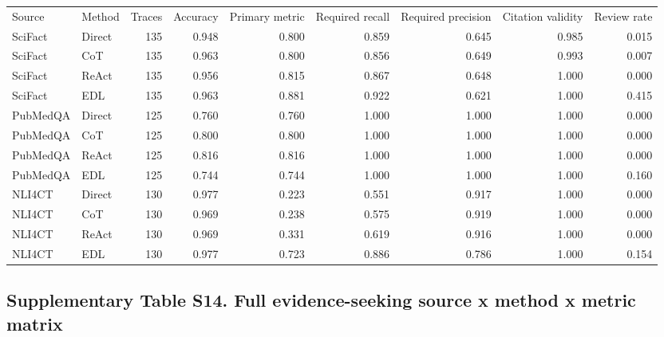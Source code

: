 \documentclass[
  8pt,
]{extarticle}
\begin{document}
\begin{center}
\begin{adjustbox}{max width=0.95\textwidth}
\begin{tabular}{@{}
llrrrrrrr@{}}
\toprule\noalign{}
Source & Method & Traces & Accuracy & Primary metric & Required recall &
Required precision & Citation validity & Review rate \\

SciFact & Direct & 135 & 0.948 & 0.800 & 0.859 & 0.645 & 0.985 &
0.015 \\
SciFact & CoT & 135 & 0.963 & 0.800 & 0.856 & 0.649 & 0.993 & 0.007 \\
SciFact & ReAct & 135 & 0.956 & 0.815 & 0.867 & 0.648 & 1.000 & 0.000 \\
SciFact & EDL & 135 & 0.963 & 0.881 & 0.922 & 0.621 & 1.000 & 0.415 \\
PubMedQA & Direct & 125 & 0.760 & 0.760 & 1.000 & 1.000 & 1.000 &
0.000 \\
PubMedQA & CoT & 125 & 0.800 & 0.800 & 1.000 & 1.000 & 1.000 & 0.000 \\
PubMedQA & ReAct & 125 & 0.816 & 0.816 & 1.000 & 1.000 & 1.000 &
0.000 \\
PubMedQA & EDL & 125 & 0.744 & 0.744 & 1.000 & 1.000 & 1.000 & 0.160 \\
NLI4CT & Direct & 130 & 0.977 & 0.223 & 0.551 & 0.917 & 1.000 & 0.000 \\
NLI4CT & CoT & 130 & 0.969 & 0.238 & 0.575 & 0.919 & 1.000 & 0.000 \\
NLI4CT & ReAct & 130 & 0.969 & 0.331 & 0.619 & 0.916 & 1.000 & 0.000 \\
NLI4CT & EDL & 130 & 0.977 & 0.723 & 0.886 & 0.786 & 1.000 & 0.154 \\
\bottomrule
\end{tabular}
\end{adjustbox}
\end{center}

\hypertarget{supplementary-table-s14-full-evidence-seeking-source-x-method-x-metric-matrix}{%
\subsection{Supplementary Table S14. Full evidence-seeking source x
method x metric
matrix}\label{supplementary-table-s14-full-evidence-seeking-source-x-method-x-metric-matrix}}
\end{document}
